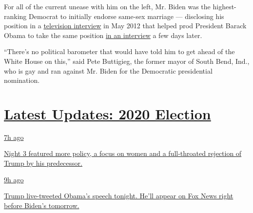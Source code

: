 For all of the current unease with him on the left, Mr. Biden was the
highest-ranking Democrat to initially endorse same-sex marriage ---
disclosing his position in a
\href{https://www.nytimes3xbfgragh.onion/2012/05/07/us/politics/biden-expresses-support-for-same-sex-marriages.html}{television
interview} in May 2012 that helped prod President Barack Obama to take
the same position
\href{https://www.nytimes3xbfgragh.onion/2012/05/10/us/politics/obama-says-same-sex-marriage-should-be-legal.html}{in
an interview} a few days later.

``There's no political barometer that would have told him to get ahead
of the White House on this,'' said Pete Buttigieg, the former mayor of
South Bend, Ind., who is gay and ran against Mr. Biden for the
Democratic presidential nomination.

\hypertarget{latest-updates-2020-election}{%
\section{\texorpdfstring{\href{https://www.nytimes3xbfgragh.onion/live/2020/08/19/us/dnc-convention-election?action=click\&pgtype=Article\&state=default\&region=MAIN_CONTENT_1\&context=storylines_live_updates}{Latest
Updates: 2020
Election}}{Latest Updates: 2020 Election}}\label{latest-updates-2020-election}}

\href{https://www.nytimes3xbfgragh.onion/live/2020/08/19/us/dnc-convention-election?action=click\&pgtype=Article\&state=default\&region=MAIN_CONTENT_1\&context=storylines_live_updates\#night-3-featured-more-policy-a-focus-on-women-and-a-full-throated-rejection-of-trump-by-his-predecessor}{7h
ago}

\href{https://www.nytimes3xbfgragh.onion/live/2020/08/19/us/dnc-convention-election?action=click\&pgtype=Article\&state=default\&region=MAIN_CONTENT_1\&context=storylines_live_updates\#night-3-featured-more-policy-a-focus-on-women-and-a-full-throated-rejection-of-trump-by-his-predecessor}{Night
3 featured more policy, a focus on women and a full-throated rejection
of Trump by his predecessor.}

\href{https://www.nytimes3xbfgragh.onion/live/2020/08/19/us/dnc-convention-election?action=click\&pgtype=Article\&state=default\&region=MAIN_CONTENT_1\&context=storylines_live_updates\#trump-live-tweeted-obamas-speech-tonight-hell-appear-on-fox-news-right-before-bidens-tomorrow}{9h
ago}

\href{https://www.nytimes3xbfgragh.onion/live/2020/08/19/us/dnc-convention-election?action=click\&pgtype=Article\&state=default\&region=MAIN_CONTENT_1\&context=storylines_live_updates\#trump-live-tweeted-obamas-speech-tonight-hell-appear-on-fox-news-right-before-bidens-tomorrow}{Trump
live-tweeted Obama's speech tonight. He'll appear on Fox News right
before Biden's tomorrow.}

